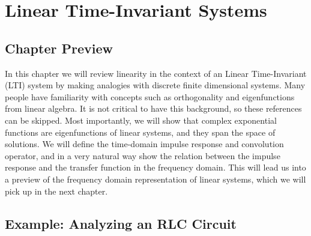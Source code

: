 \chapter{Linear Time-Invariant Systems}
\label{ch:ch01_LTI}
\graphicspath{{./figs_LTI/}}
\section{Chapter Preview}
In this chapter we will review linearity in the context of an Linear Time-Invariant (LTI) system by making analogies with discrete finite dimensional systems.  Many people have familiarity with concepts such as orthogonality and eigenfunctions from linear algebra.  It is not critical to have this background, so these references can be skipped.  Most importantly, we will show that complex exponential functions are eigenfunctions of linear systems, and they span the space of solutions.  We will define the time-domain impulse response and convolution operator, and in a very natural way show the relation between the impulse response and the transfer function in the frequency domain.  This will lead us into a preview of the frequency domain representation of linear systems, which we will pick up in the next chapter.
\newpage
\section{Example: Analyzing an RLC Circuit}
